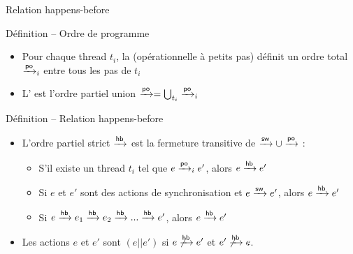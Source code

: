 
\begingroup

\begin{frame}{Relation happens-before}

  \begin{block}{Définition -- Ordre de programme}
    \begin{itemize}
    \item Pour chaque thread $t_i$, la  (opérationnelle à petits pas)
      définit un \alert{ordre total} $\xrightarrow{\mathsf{po}}_i$ entre tous les pas de $t_i$
    \item L' est l'\alert{ordre partiel} union $\xrightarrow{\mathsf{po}} = \bigcup_{t_i} \xrightarrow{\mathsf{po}}_i$
    \end{itemize}
  \end{block}

  \pause
  
  \begin{block}{Définition -- Relation happens-before}
    \begin{itemize}
    \item     L'\alert{ordre partiel strict} $\xrightarrow{\mathsf{hb}}$ est la fermeture transitive de $\xrightarrow{\mathsf{sw}} \cup \xrightarrow{\mathsf{po}}$ :
      \begin{itemize}
      \item S'il existe un thread $t_i$ tel que $e \xrightarrow{\mathsf{po}}_i e'$, alors $e \xrightarrow{\mathsf{hb}} e'$
      \item Si $e$ et $e'$ sont des actions de synchronisation et $e \xrightarrow{\mathsf{sw}} e'$, alors $e \xrightarrow{\mathsf{hb}} e'$
      \item Si $e \xrightarrow{\mathsf{hb}} e_1 \xrightarrow{\mathsf{hb}} e_2 \xrightarrow{\mathsf{hb}} ... \xrightarrow{\mathsf{hb}} e'$, alors $e \xrightarrow{\mathsf{hb}} e'$
      \end{itemize}
    \item  Les actions $e$ et $e'$ sont  $(e || e')$ si $e\not\xrightarrow{\mathsf{hb}} e'$ et $e'\not\xrightarrow{\mathsf{hb}} e$.
    \end{itemize}
  \end{block}
  
\end{frame}

\endgroup
\endinput
